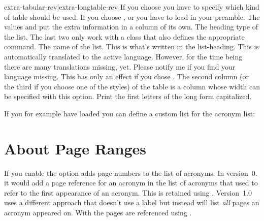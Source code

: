 \documentclass[DIV10,toc=index,toc=bib,hyperfootnotes=false]{cnpkgdoc}
\makeatletter
\providecommand*\changedversion[1]{%
  \@bsphack
  \marginnote{%
    \footnotesize\sffamily\RaggedRight
    \textcolor{black!75}{Changed in version~#1}}%
  \@esphack}
\newcommand\versionstar{\texorpdfstring{\@versionstar}{*}}
\makeatother
\begin{document}
\begin{beschreibung}
{ extra-tabular-rev|extra-longtable-rev}
   If you choose  you have to specify which kind of table
   should be used. If you choose ,  or
    you have to load  in your preamble.
   The values  and  put the extra
   information in a column of its own.
   \changedversion{1.3}The heading type of the list. The last two only work with
   a \KOMAScript{} class that also defines the appropriate command.
   The name of the list. This is what's written in the list-heading. This is
   automatically translated to the active language. However, for the time being
   there are many translations missing, yet. Please notify me if you find your
   language missing.
   This has only an effect if you chose . The second column
   (or the third if you choose one of the  styles) of the table is a
    column whose width can be specified with this option.
   Print the first letters of the long form capitalized.
\end{beschreibung}

If you for example have loaded  you can define a custom list for
the acronym list:
\begin{beispiel}
 \newcommand*\addcolon[1]{#1:}
 \printacronyms
\end{beispiel}
\newcommand*\addcolon[1]{#1:}
\printacronyms

\section{About Page Ranges}
If you enable the  option \acro adds page numbers to the list of
acronyms. In version~0.\versionstar{} it would add a page reference for an acronym
in the list of acronyms that used  to refer to the first appearance
of an acronym. This is retained using . Version~1.0 uses a
different approach that doesn't use a label but instead will list \emph{all}
pages an acronym appeared on. With  the pages are referenced
using .
\end{document}
